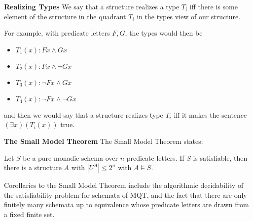 \begin{mdframed}[linewidth=1]
\textbf{Realizing Types} 
We say that a structure realizes a type $T_i$ iff there is some element of the structure in the quadrant $T_i$ in the types view of our structure. 

For example, with predicate letters $F, G$, the types would then be 
\begin{itemize}
    \item $T_1(x): Fx \land Gx$

    \item $T_2(x): Fx \land \lnot Gx$

    \item $T_3(x): \lnot Fx \land Gx$

    \item $T_4(x): \lnot Fx \land \lnot Gx$
\end{itemize}
and then we would say that a structure realizes type $T_i$ iff it makes the sentence $(\exists x)(T_i(x))$ true. 

\textbf{The Small Model Theorem}
The Small Model Theorem states:
\begin{theorem}
Let $S$ be a pure monadic schema over $n$ predicate letters. If $S$ is satisfiable, then there is a structure $A$ with $|U^A| \leq 2^n$ with $A \models S$. 
\end{theorem}

Corollaries to the Small Model Theorem include the algorithmic decidability of the satisfiability problem for schemata of MQT, and the fact that there are only finitely many schemata up to equivalence whose predicate letters are drawn from a fixed finite set.
\iffalse
This immediately gives as a corollary the algorithmic decidability of satisfiability for MQT. To see this, we noted the following equivalence (the \emph{contrapositive})
\[
    (p \supset q) \equiv (\lnot q \supset \lnot p)
\]
Then the contrapositive of our theorem is: \emph{if there is no structure $A$ with $|A| \leq 2^n$ such that $A \models S$, then $A$ is not satisfiable}. Thus, we have to check only a finite number of models to see if $S$ is satisfiable or not, and hence satisfiability is algorithmically decidable. 
\fi
\end{mdframed}



